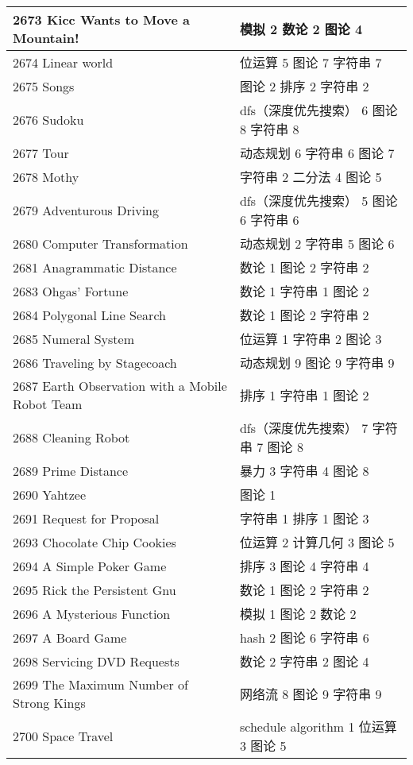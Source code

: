 \begin{longtable}{| p{} | p{} |}
 2673 Kicc Wants to Move a Mountain!  & 模拟 2 数论 2 图论 4 \\ \hline
 2674 Linear world  & 位运算 5 图论 7 字符串 7 \\ \hline
 2675 Songs  & 图论 2 排序 2 字符串 2 \\ \hline
 2676 Sudoku  & dfs（深度优先搜索） 6 图论 8 字符串 8 \\ \hline
 2677 Tour  & 动态规划 6 字符串 6 图论 7 \\ \hline
 2678 Mothy  & 字符串 2 二分法 4 图论 5 \\ \hline
 2679 Adventurous Driving  & dfs（深度优先搜索） 5 图论 6 字符串 6 \\ \hline
 2680 Computer Transformation  & 动态规划 2 字符串 5 图论 6 \\ \hline
 2681 Anagrammatic Distance  & 数论 1 图论 2 字符串 2 \\ \hline
 2683 Ohgas' Fortune  & 数论 1 字符串 1 图论 2 \\ \hline
 2684 Polygonal Line Search  & 数论 1 图论 2 字符串 2 \\ \hline
 2685 Numeral System  & 位运算 1 字符串 2 图论 3 \\ \hline
 2686 Traveling by Stagecoach  & 动态规划 9 图论 9 字符串 9 \\ \hline
 2687 Earth Observation with a Mobile Robot Team  & 排序 1 字符串 1 图论 2 \\ \hline
 2688 Cleaning Robot  & dfs（深度优先搜索） 7 字符串 7 图论 8 \\ \hline
 2689 Prime Distance  & 暴力 3 字符串 4 图论 8 \\ \hline
 2690 Yahtzee  & 图论 1 \\ \hline
 2691 Request for Proposal  & 字符串 1 排序 1 图论 3 \\ \hline
 2693 Chocolate Chip Cookies  & 位运算 2 计算几何 3 图论 5 \\ \hline
 2694 A Simple Poker Game  & 排序 3 图论 4 字符串 4 \\ \hline
 2695 Rick the Persistent Gnu  & 数论 1 图论 2 字符串 2 \\ \hline
 2696 A Mysterious Function  & 模拟 1 图论 2 数论 2 \\ \hline
 2697 A Board Game  & hash 2 图论 6 字符串 6 \\ \hline
 2698 Servicing DVD Requests  & 数论 2 字符串 2 图论 4 \\ \hline
 2699 The Maximum Number of Strong Kings  & 网络流 8 图论 9 字符串 9 \\ \hline
 2700 Space Travel  & schedule algorithm 1 位运算 3 图论 5 \\ \hline

\end{longtable}
